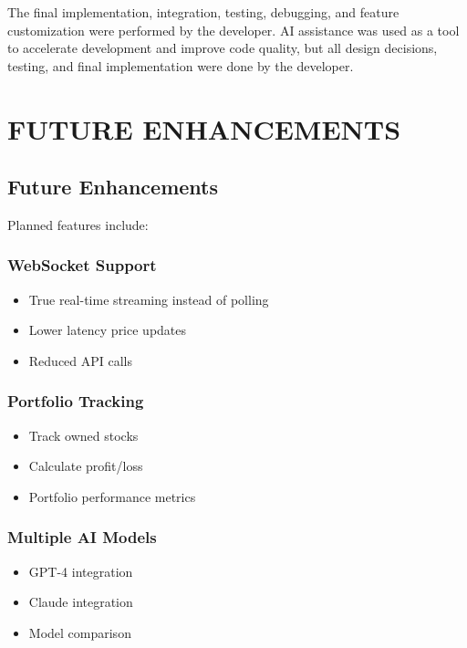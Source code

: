 \documentclass[12pt,a4paper]{article}
\begin{document}
The final implementation, integration, testing, debugging, and feature customization were performed by the developer. AI assistance was used as a tool to accelerate development and improve code quality, but all design decisions, testing, and final implementation were done by the developer.

\newpage

\section{FUTURE ENHANCEMENTS}

\subsection{Future Enhancements}

Planned features include:

\subsubsection{WebSocket Support}
\begin{itemize}[itemsep=0.3em]
    \item True real-time streaming instead of polling
    \item Lower latency price updates
    \item Reduced API calls
\end{itemize}

\subsubsection{Portfolio Tracking}
\begin{itemize}[itemsep=0.3em]
    \item Track owned stocks
    \item Calculate profit/loss
    \item Portfolio performance metrics
\end{itemize}

\subsubsection{Multiple AI Models}
\begin{itemize}[itemsep=0.3em]
    \item GPT-4 integration
    \item Claude integration
    \item Model comparison
\end{itemize}
\end{document}
